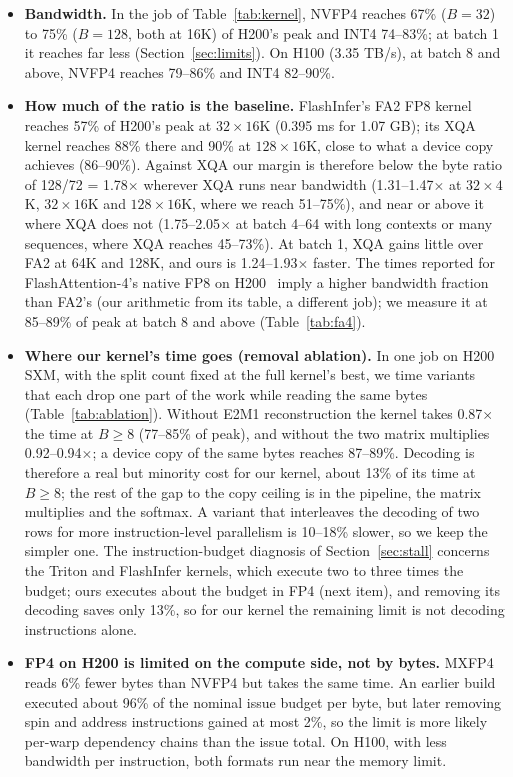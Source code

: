 \documentclass[11pt]{article}
\begin{document}
\begin{itemize}
  \item \textbf{Bandwidth.} In the job of Table~\ref{tab:kernel}, NVFP4 reaches 67\% ($B = 32$) to 75\% ($B = 128$, both at 16K) of H200's peak and INT4 74--83\%; at batch 1 it reaches far less (Section~\ref{sec:limits}). On H100 (3.35 TB/s), at batch 8 and above, NVFP4 reaches 79--86\% and INT4 82--90\%.
  \item \textbf{How much of the ratio is the baseline.} FlashInfer's FA2 FP8 kernel reaches 57\% of H200's peak at $32 \times 16$K (0.395 ms for 1.07 GB); its XQA kernel reaches 88\% there and 90\% at $128 \times 16$K, close to what a device copy achieves (86--90\%). Against XQA our margin is therefore below the byte ratio of 128/72 = 1.78$\times$ wherever XQA runs near bandwidth (1.31--1.47$\times$ at $32 \times 4$K, $32 \times 16$K and $128 \times 16$K, where we reach 51--75\%), and near or above it where XQA does not (1.75--2.05$\times$ at batch 4--64 with long contexts or many sequences, where XQA reaches 45--73\%). At batch 1, XQA gains little over FA2 at 64K and 128K, and ours is 1.24--1.93$\times$ faster. The times reported for FlashAttention-4's native FP8 on H200~\cite{fa206} imply a higher bandwidth fraction than FA2's (our arithmetic from its table, a different job); we measure it at 85--89\% of peak at batch 8 and above (Table~\ref{tab:fa4}).
  \item \textbf{Where our kernel's time goes (removal ablation).} In one job on H200 SXM, with the split count fixed at the full kernel's best, we time variants that each drop one part of the work while reading the same bytes (Table~\ref{tab:ablation}). Without E2M1 reconstruction the kernel takes 0.87$\times$ the time at $B \geq 8$ (77--85\% of peak), and without the two matrix multiplies 0.92--0.94$\times$; a device copy of the same bytes reaches 87--89\%. Decoding is therefore a real but minority cost for our kernel, about 13\% of its time at $B \geq 8$; the rest of the gap to the copy ceiling is in the pipeline, the matrix multiplies and the softmax. A variant that interleaves the decoding of two rows for more instruction-level parallelism is 10--18\% slower, so we keep the simpler one. The instruction-budget diagnosis of Section~\ref{sec:stall} concerns the Triton and FlashInfer kernels, which execute two to three times the budget; ours executes about the budget in FP4 (next item), and removing its decoding saves only 13\%, so for our kernel the remaining limit is not decoding instructions alone.
  \item \textbf{FP4 on H200 is limited on the compute side, not by bytes.} MXFP4 reads 6\% fewer bytes than NVFP4 but takes the same time. An earlier build executed about 96\% of the nominal issue budget per byte, but later removing spin and address instructions gained at most 2\%, so the limit is more likely per-warp dependency chains than the issue total. On H100, with less bandwidth per instruction, both formats run near the memory limit.

\end{itemize}
\end{document}
